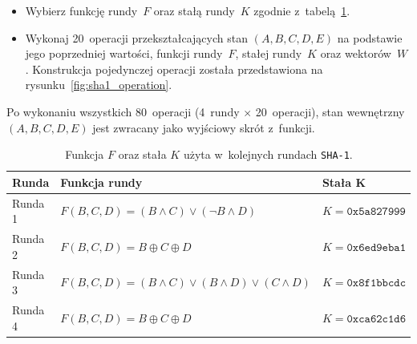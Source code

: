 \begin{myenumerate}
\begin{myenumerate}
\begin{itemize}
\begin{itemize}
                \item Wybierz funkcję rundy~$F$ oraz stałą rundy~$K$ zgodnie
                z~tabelą~\ref{tbl:sha1_round_function}.

                \item Wykonaj 20~operacji przekształcających stan $(A,B,C,D,E)$
                na podstawie jego poprzedniej wartości, funkcji rundy~$F$,
                stałej rundy~$K$ oraz wektorów~$W$. Konstrukcja pojedynczej
                operacji została przedstawiona na
                rysunku~\ref{fig:sha1_operation}.

            \end{itemize}

        \end{itemize}

    \end{myenumerate}

    \item Po wykonaniu wszystkich 80~operacji (4~rundy $\times$ 20~operacji),
    stan wewnętrzny $(A,B,C,D,E)$ jest zwracany jako wyjściowy skrót z~funkcji.

\end{myenumerate}

\begin{table}[H]
    \caption{Funkcja $F$ oraz stała $K$ użyta w~kolejnych rundach
    \texttt{SHA-1}.}
    \label{tbl:sha1_round_function}
    \begin{tabular}{|l|l|l|}
        \hline
        Runda & Funkcja rundy & Stała K \\
        \hline
        Runda 1 &
        $F(B,C,D) = (B \land C) \lor (\lnot B \land D)$ &
        $K = \mathtt{0x5a827999}$ \\

        Runda 2 &
        $F(B,C,D) = B \oplus C \oplus D$ &
        $K = \mathtt{0x6ed9eba1}$ \\

        Runda 3 &
        $F(B,C,D) = (B \land C) \lor (B \land D) \lor (C \land D)$ &
        $K = \mathtt{0x8f1bbcdc}$ \\

        Runda 4 &
        $F(B,C,D) = B \oplus C \oplus D$ &
        $K = \mathtt{0xca62c1d6}$ \\
        \hline
    \end{tabular}
\end{table}


